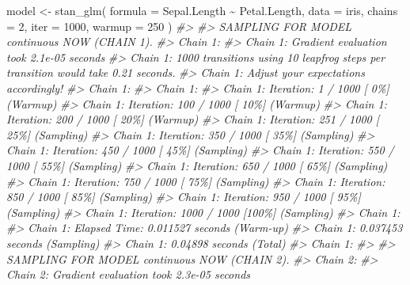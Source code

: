 \documentclass[10pt,a4paper,onecolumn]{article}
\newenvironment{Shaded}{\begin{snugshade}}{\end{snugshade}}
\newcommand{\AttributeTok}[1]{\textcolor[rgb]{0.77,0.63,0.00}{#1}}
\newcommand{\CommentTok}[1]{\textcolor[rgb]{0.56,0.35,0.01}{\textit{#1}}}
\newcommand{\DecValTok}[1]{\textcolor[rgb]{0.00,0.00,0.81}{#1}}
\newcommand{\FunctionTok}[1]{\textcolor[rgb]{0.00,0.00,0.00}{#1}}
\newcommand{\NormalTok}[1]{#1}
\newcommand{\OtherTok}[1]{\textcolor[rgb]{0.56,0.35,0.01}{#1}}
\newcommand{\SpecialCharTok}[1]{\textcolor[rgb]{0.00,0.00,0.00}{#1}}
\begin{document}
\begin{Shaded}
\begin{Highlighting}[]
\NormalTok{model }\OtherTok{\textless{}{-}} \FunctionTok{stan\_glm}\NormalTok{(}
    \AttributeTok{formula =}\NormalTok{ Sepal.Length }\SpecialCharTok{\textasciitilde{}}\NormalTok{ Petal.Length,}
    \AttributeTok{data =}\NormalTok{ iris,}
    \AttributeTok{chains =} \DecValTok{2}\NormalTok{,}
    \AttributeTok{iter =} \DecValTok{1000}\NormalTok{,}
    \AttributeTok{warmup =} \DecValTok{250}
\NormalTok{  )}
\CommentTok{\#\textgreater{} }
\CommentTok{\#\textgreater{} SAMPLING FOR MODEL \textquotesingle{}continuous\textquotesingle{} NOW (CHAIN 1).}
\CommentTok{\#\textgreater{} Chain 1: }
\CommentTok{\#\textgreater{} Chain 1: Gradient evaluation took 2.1e{-}05 seconds}
\CommentTok{\#\textgreater{} Chain 1: 1000 transitions using 10 leapfrog steps per transition would take 0.21 seconds.}
\CommentTok{\#\textgreater{} Chain 1: Adjust your expectations accordingly!}
\CommentTok{\#\textgreater{} Chain 1: }
\CommentTok{\#\textgreater{} Chain 1: }
\CommentTok{\#\textgreater{} Chain 1: Iteration:   1 / 1000 [  0\%]  (Warmup)}
\CommentTok{\#\textgreater{} Chain 1: Iteration: 100 / 1000 [ 10\%]  (Warmup)}
\CommentTok{\#\textgreater{} Chain 1: Iteration: 200 / 1000 [ 20\%]  (Warmup)}
\CommentTok{\#\textgreater{} Chain 1: Iteration: 251 / 1000 [ 25\%]  (Sampling)}
\CommentTok{\#\textgreater{} Chain 1: Iteration: 350 / 1000 [ 35\%]  (Sampling)}
\CommentTok{\#\textgreater{} Chain 1: Iteration: 450 / 1000 [ 45\%]  (Sampling)}
\CommentTok{\#\textgreater{} Chain 1: Iteration: 550 / 1000 [ 55\%]  (Sampling)}
\CommentTok{\#\textgreater{} Chain 1: Iteration: 650 / 1000 [ 65\%]  (Sampling)}
\CommentTok{\#\textgreater{} Chain 1: Iteration: 750 / 1000 [ 75\%]  (Sampling)}
\CommentTok{\#\textgreater{} Chain 1: Iteration: 850 / 1000 [ 85\%]  (Sampling)}
\CommentTok{\#\textgreater{} Chain 1: Iteration: 950 / 1000 [ 95\%]  (Sampling)}
\CommentTok{\#\textgreater{} Chain 1: Iteration: 1000 / 1000 [100\%]  (Sampling)}
\CommentTok{\#\textgreater{} Chain 1: }
\CommentTok{\#\textgreater{} Chain 1:  Elapsed Time: 0.011527 seconds (Warm{-}up)}
\CommentTok{\#\textgreater{} Chain 1:                0.037453 seconds (Sampling)}
\CommentTok{\#\textgreater{} Chain 1:                0.04898 seconds (Total)}
\CommentTok{\#\textgreater{} Chain 1: }
\CommentTok{\#\textgreater{} }
\CommentTok{\#\textgreater{} SAMPLING FOR MODEL \textquotesingle{}continuous\textquotesingle{} NOW (CHAIN 2).}
\CommentTok{\#\textgreater{} Chain 2: }
\CommentTok{\#\textgreater{} Chain 2: Gradient evaluation took 2.3e{-}05 seconds}

\end{Highlighting}
\end{Shaded}
\end{document}
